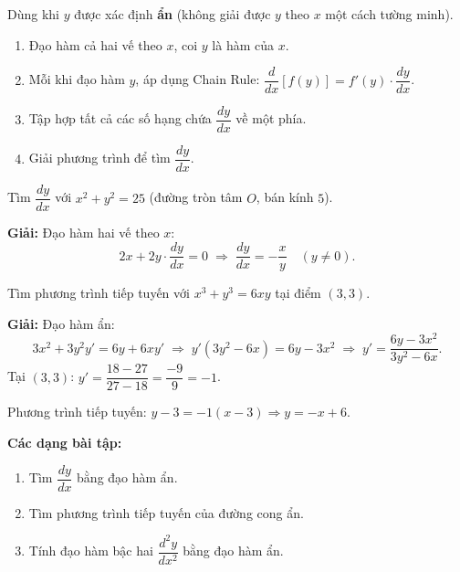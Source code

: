 \documentclass[12pt,a4paper]{article}
\begin{document}
\begin{phuongphap}[title={Phương pháp đạo hàm ẩn}]
  Dùng khi $y$ được xác định \textbf{ẩn} (không giải được $y$ theo $x$ một cách tường minh).
  \begin{enumerate}
    \item Đạo hàm cả hai vế theo $x$, coi $y$ là hàm của $x$.
    \item Mỗi khi đạo hàm $y$, áp dụng Chain Rule: $\dfrac{d}{dx}[f(y)] = f'(y) \cdot \dfrac{dy}{dx}$.
    \item Tập hợp tất cả các số hạng chứa $\dfrac{dy}{dx}$ về một phía.
    \item Giải phương trình để tìm $\dfrac{dy}{dx}$.
  \end{enumerate}
\end{phuongphap}

\begin{vidu}
  Tìm $\dfrac{dy}{dx}$ với $x^2 + y^2 = 25$ (đường tròn tâm $O$, bán kính $5$).

  \medskip\textbf{Giải:}
  Đạo hàm hai vế theo $x$:
  \[
    2x + 2y \cdot \dfrac{dy}{dx} = 0
    \;\Rightarrow\;
    \dfrac{dy}{dx} = -\dfrac{x}{y} \quad (y \ne 0).
  \]
\end{vidu}

\begin{vidu}
  Tìm phương trình tiếp tuyến với $x^3 + y^3 = 6xy$ tại điểm $(3, 3)$.

  \medskip\textbf{Giải:}
  Đạo hàm ẩn:
  \[
    3x^2 + 3y^2 y' = 6y + 6x y'
    \;\Rightarrow\;
    y'(3y^2 - 6x) = 6y - 3x^2
    \;\Rightarrow\;
    y' = \dfrac{6y - 3x^2}{3y^2 - 6x}.
  \]
  Tại $(3, 3)$: $y' = \dfrac{18 - 27}{27 - 18} = \dfrac{-9}{9} = -1$.

  Phương trình tiếp tuyến: $y - 3 = -1(x - 3) \Rightarrow y = -x + 6$.
\end{vidu}

\medskip\noindent\textbf{Các dạng bài tập:}
\begin{enumerate}[label=\textbf{Dạng \arabic*:}, leftmargin=*, align=left]
  \item Tìm $\dfrac{dy}{dx}$ bằng đạo hàm ẩn.
  \item Tìm phương trình tiếp tuyến của đường cong ẩn.
  \item Tính đạo hàm bậc hai $\dfrac{d^2y}{dx^2}$ bằng đạo hàm ẩn.
\end{enumerate}

\end{document}
